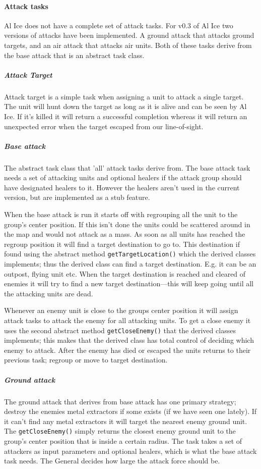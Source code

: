 \paragraph{Attack tasks}
\label{sec:attack_tasks}
Al Ice does not have a complete set of attack tasks. For v0.3 of Al Ice two versions of attacks have
been implemented. A ground attack that attacks ground targets, and an air attack that attacks air
units. Both of these tasks derive from the base attack that is an abstract task class.

\subparagraph{Attack Target}
Attack target is a simple task when assigning a unit to attack a single target. The unit will hunt
down the target as long as it is alive and can be seen by Al Ice. If it's killed it will return a
successful completion whereas it will return an unexpected error when the target escaped from our
line-of-sight.

\subparagraph{Base attack}
The abstract task class that 'all' attack tasks derive from. The base attack task needs a set of
attacking units and optional healers if the attack group should have designated healers to it.
However the healers aren't used in the current version, but are implemented as a stub feature.

When the base attack is run it starts off with regrouping all the unit to the group's center
position. If this isn't done the units could be scattered around in the map and would not attack as a mass. As
soon as all units has reached the regroup position it will find a target destination to go to. This
destination if found using the abstract method \texttt{getTargetLocation()} which the derived classes
implements; thus the derived class can find a target destination. E.g. it can be an outpost, flying
unit etc. When the target destination is reached and cleared of enemies it will try to find a new
target destination---this will keep going until all the attacking units are dead.

Whenever an enemy unit is close to the groups center position it will assign attack tasks to attack
the enemy for all attacking units. To get a close enemy it uses the second abstract method
\texttt{getCloseEnemy()} that the derived classes implements; this makes that the derived class has
total control of deciding which enemy to attack. After the enemy has died or escaped the units
returns to their previous task; regroup or move to target destination.

\subparagraph{Ground attack}
The ground attack that derives from base attack has one primary strategy; destroy the enemies metal
extractors if some exists (if we have seen one lately). If it can't find any metal extractors it will
target the nearest enemy ground unit. The \texttt{getCloseEnemy()} simply returns the closest
enemy ground unit to the group's center position that is inside a certain radius. The task takes a
set of attackers as input parameters and optional healers, which is what the base attack task needs. The
General decides how large the attack force should be.

